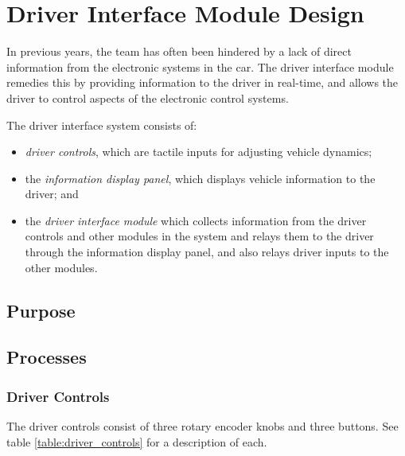 \section{Driver Interface Module Design\label{sec:Driver-Interface-Module}}


In previous years, the team has often been hindered by a lack of direct information from the electronic systems in the car. The driver interface module remedies this by providing information to the driver in real-time, and allows the driver to control aspects of the electronic control systems.

The driver interface system consists of:

\begin{itemize}
\item \emph{driver controls}, which are tactile inputs for adjusting vehicle dynamics; 
\item the \emph{information display panel}, which displays vehicle information to the driver; and
\item the \emph{driver interface module} which collects information from the driver controls and other modules in the system and relays them to the driver through the information display panel, and also relays driver inputs to the other modules.
\end{itemize}


\subsection{Purpose}


\subsection{Processes}


\subsubsection{Driver Controls}
The driver controls consist of three rotary encoder knobs and three buttons. See table \ref{table:driver_controls} for a description of each.

